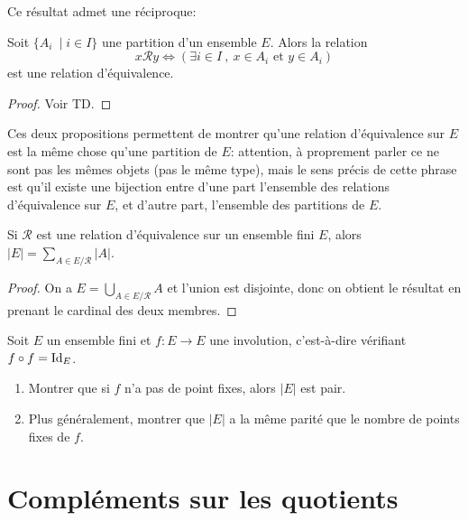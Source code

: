 Ce résultat admet une \og réciproque\fg : 

\begin{proposition}
Soit $\{A_i\:\mid i\in I\}$ une partition d'un ensemble $E$. Alors la relation
\[
x\mathcal R y \iff \left( \exists i\in I\:,\: x\in A_i\text{ et } y\in A_i\right)
\]
est une relation d'équivalence.
\end{proposition}
\begin{proof}
Voir TD.
\end{proof}

Ces deux propositions permettent de montrer qu'\og une relation d'équivalence sur $E$ est la même chose qu'une partition de $E$\fg : attention, à proprement parler ce ne sont pas les mêmes objets (pas le même type), mais le sens précis de cette phrase est qu'il existe une bijection entre d'une part l'ensemble des relations d'équivalence sur $E$, et d'autre part, l'ensemble des partitions de $E$.

\begin{corollaire}
Si $\mathcal R$ est une relation d'équivalence sur un ensemble fini $E$, alors $|E| = \sum_{A\in E/\mathcal R} |A|$.
\end{corollaire}
\begin{proof}
On a  $E= \bigcup_{A\in E/\mathcal R} A$ et l'union est disjointe, donc on obtient le résultat en prenant le cardinal des deux membres.
\end{proof}


\begin{exercice}
Soit $E$ un ensemble fini et $f : E\to E$ une involution, c'est-à-dire vérifiant $f\circ f = \operatorname{Id}_E$.
\begin{enumerate}
\item Montrer que si $f$ n'a pas de point fixes, alors $|E|$ est pair.
\item Plus généralement, montrer que $|E|$ a la même parité que le nombre de points fixes de $f$.
\end{enumerate}
\end{exercice}

\section{Compléments sur les quotients}

